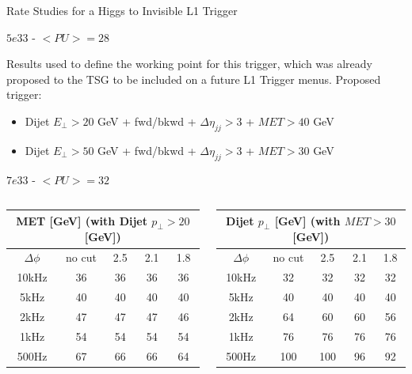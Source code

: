 \documentclass[8pt]{beamer}
\begin{document}
\begin{frame}{Rate Studies for a Higgs to Invisible L1 Trigger}
\begin{block}{$5e33$ - $<PU>=28$}
\end{block}

Results used to define the working point for this trigger, which was already proposed to the TSG to be included
on a future L1 Trigger menus. Proposed trigger:
\begin{itemize}
  \item Dijet $E_\bot>20$ GeV + fwd/bkwd + $\Delta\eta_{jj}>3$ + $MET>40$ GeV
  \item Dijet $E_\bot>50$ GeV + fwd/bkwd + $\Delta\eta_{jj}>3$ + $MET>30$ GeV
\end{itemize}


\begin{block}{$7e33$ - $<PU>=32$}

  \begin{columns}

  \column[t]{5.5cm}  
\begin{footnotesize} 
\begin{tabular}{|c||c|c|c|c|}
\hline
\multicolumn{5}{|c|}{MET [GeV] (with Dijet $p_\bot>20$ [GeV])} \\
\hline
$\Delta\phi$ & no cut & 2.5 & 2.1 & 1.8 \\
\hline
10kHz        &     36 &  36 &  36 &  36 \\
5kHz         &     40 &  40 &  40 &  40 \\
2kHz         &     47 &  47 &  47 &  46 \\
1kHz         &     54 &  54 &  54 &  54 \\
500Hz        &     67 &  66 &  66 &  64 \\
\hline
\end{tabular}
\end{footnotesize}

  \column[t]{5.5cm} 
\begin{footnotesize}  
\begin{tabular}{|c||c|c|c|c|}
\hline
\multicolumn{5}{|c|}{Dijet $p_\bot$ [GeV] (with $MET>30$ [GeV])} \\
\hline
$\Delta\phi$ & no cut & 2.5 & 2.1 & 1.8 \\
\hline
10kHz        &     32 &  32 &  32 &  32 \\
5kHz         &     40 &  40 &  40 &  40 \\
2kHz         &     64 &  60 &  60 &  56 \\
1kHz         &     76 &  76 &  76 &  76 \\
500Hz        &    100 & 100 &  96 &  92 \\
\hline
\end{tabular}
\end{footnotesize}

  \end{columns}

\end{block}

\end{frame}
\end{document}
